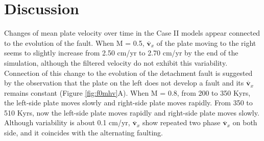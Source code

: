 \documentclass[letterpaper,12pt,notitle]{memphisthesis}                     %
\begin{document}
\chapter{Discussion}


%

Changes of mean plate velocity over time in the Case II models appear connected to the evolution of the fault.
When M = 0.5, $\overline{\boldsymbol{v}}_{x}$ of the plate moving to the right seems to slightly increase from 2.50 cm/yr to 2.70 cm/yr by the end of the simulation, although the filtered velocity do not exhibit this variability. Connection of this change to the evolution of the detachment fault is suggested by the observation that the plate on the left does not develop a fault and its $\overline{\boldsymbol{v}}_{x}$ remains constant (Figure \ref{fig:f0mhv}A). When M = 0.8, from 200 to 350 Kyrs, the left-side plate moves slowly and right-side plate moves rapidly. From 350 to 510 Kyrs, now the left-side plate moves rapidly and right-side plate moves slowly. Although variability is about 0.1 cm/yr, $\overline{\boldsymbol{v}}_{x}$ show repeated two phase $\overline{\boldsymbol{v}}_{x}$ on both side, and it coincides with the alternating faulting. 
\end{document}
